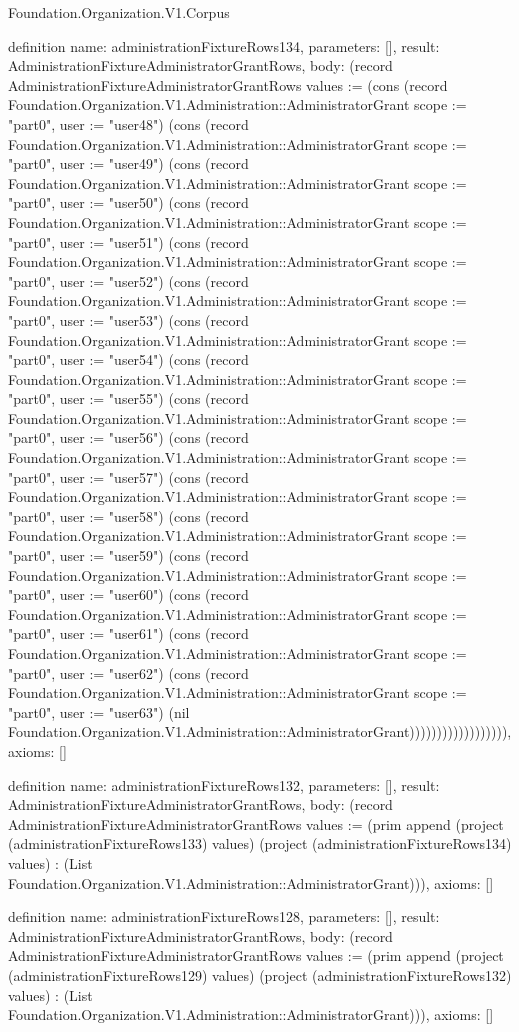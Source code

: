 \begin{lexlean}{Foundation.Organization.V1.Corpus}
\begin{semanticmodule}
definition{
  name: administrationFixtureRows134,
  parameters: [],
  result: AdministrationFixtureAdministratorGrantRows,
  body: (record AdministrationFixtureAdministratorGrantRows {values := (cons (record Foundation.Organization.V1.Administration::AdministratorGrant {scope := "part0", user := "user48"}) (cons (record Foundation.Organization.V1.Administration::AdministratorGrant {scope := "part0", user := "user49"}) (cons (record Foundation.Organization.V1.Administration::AdministratorGrant {scope := "part0", user := "user50"}) (cons (record Foundation.Organization.V1.Administration::AdministratorGrant {scope := "part0", user := "user51"}) (cons (record Foundation.Organization.V1.Administration::AdministratorGrant {scope := "part0", user := "user52"}) (cons (record Foundation.Organization.V1.Administration::AdministratorGrant {scope := "part0", user := "user53"}) (cons (record Foundation.Organization.V1.Administration::AdministratorGrant {scope := "part0", user := "user54"}) (cons (record Foundation.Organization.V1.Administration::AdministratorGrant {scope := "part0", user := "user55"}) (cons (record Foundation.Organization.V1.Administration::AdministratorGrant {scope := "part0", user := "user56"}) (cons (record Foundation.Organization.V1.Administration::AdministratorGrant {scope := "part0", user := "user57"}) (cons (record Foundation.Organization.V1.Administration::AdministratorGrant {scope := "part0", user := "user58"}) (cons (record Foundation.Organization.V1.Administration::AdministratorGrant {scope := "part0", user := "user59"}) (cons (record Foundation.Organization.V1.Administration::AdministratorGrant {scope := "part0", user := "user60"}) (cons (record Foundation.Organization.V1.Administration::AdministratorGrant {scope := "part0", user := "user61"}) (cons (record Foundation.Organization.V1.Administration::AdministratorGrant {scope := "part0", user := "user62"}) (cons (record Foundation.Organization.V1.Administration::AdministratorGrant {scope := "part0", user := "user63"}) (nil Foundation.Organization.V1.Administration::AdministratorGrant)))))))))))))))))}),
  axioms: []
}

definition{
  name: administrationFixtureRows132,
  parameters: [],
  result: AdministrationFixtureAdministratorGrantRows,
  body: (record AdministrationFixtureAdministratorGrantRows {values := (prim append (project (administrationFixtureRows133) values) (project (administrationFixtureRows134) values) : (List Foundation.Organization.V1.Administration::AdministratorGrant))}),
  axioms: []
}

definition{
  name: administrationFixtureRows128,
  parameters: [],
  result: AdministrationFixtureAdministratorGrantRows,
  body: (record AdministrationFixtureAdministratorGrantRows {values := (prim append (project (administrationFixtureRows129) values) (project (administrationFixtureRows132) values) : (List Foundation.Organization.V1.Administration::AdministratorGrant))}),
  axioms: []
}


\end{semanticmodule}
\end{lexlean}
